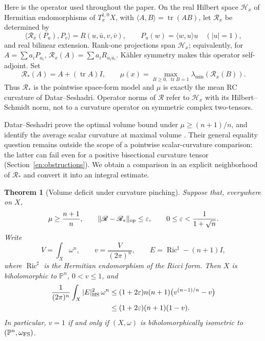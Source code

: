 \documentclass[12pt]{amsart}
\newtheorem{thm}{Theorem}[section]
\theoremstyle{definition}
\theoremstyle{remark}
\numberwithin{equation}{section}
\DeclareMathOperator{\Ric}{Ric}
\DeclareMathOperator{\tr}{tr}
\theoremstyle{plain}
\theoremstyle{remark}
\theoremstyle{definition}
\begin{document}
Here is the operator used throughout the paper. On the real Hilbert space
$\mathcal H_x$ of Hermitian endomorphisms of $T_x^{1,0}X$, with
$\langle A,B\rangle=\tr(AB)$, let $\mathscr R_x$ be determined by
\begin{equation}\label{en:Rdef}
 \langle\mathscr R_x(P_u),P_v\rangle=R(u,\bar u,v,\bar v),
 \qquad P_u(w)=\langle w,u\rangle u\quad (|u|=1),
\end{equation}
and real bilinear extension. Rank-one projections span $\mathcal H_x$;
equivalently, for $A=\sum a_iP_{u_i}$,
$\mathscr R_x(A)=\sum a_iR_{u_i\bar u_i}$.
K\"ahler symmetry makes this operator self-adjoint. Set
\begin{equation}\label{en:model}
 \mathscr R_*(A)=A+(\tr A)I,
 \qquad \mu(x)=\max_{B\geq0,\ \tr B=1}\lambda_{\min}(\mathscr R_x(B)).
\end{equation}
Thus $\mathscr R_*$ is the pointwise space-form model and $\mu$ is exactly
the mean RC curvature of Datar--Seshadri. Operator norms of $\mathscr R$
refer to $\mathcal H_x$ with its Hilbert--Schmidt norm, not to a curvature
operator on symmetric complex two-tensors.

Datar--Seshadri prove the optimal volume bound under
$\mu\geq(n+1)/n$, and identify the average scalar curvature at maximal
volume \cite[Theorems 1.1 and 5.2]{en:DS}. Their general equality question
remains outside the scope of a pointwise scalar-curvature comparison:
the latter can fail even for a positive bisectional curvature tensor
(Section~\ref{en:obstructions}). We obtain a comparison in an explicit
neighborhood of $\mathscr R_*$ and convert it into an integral estimate.

\begin{thm}[Volume deficit under curvature pinching]\label{en:main}
Suppose that, everywhere on $X$,
\begin{equation}\label{en:assumptions}
 \mu\geq\frac{n+1}{n},\qquad
 \|\mathscr R-\mathscr R_*\|_{\rm op}\leq\varepsilon,
 \qquad 0\leq\varepsilon<\frac1{1+\sqrt n}.
\end{equation}
Write
\[
 V=\int_X\omega^n,\qquad v=\frac{V}{(2\pi)^n},
 \qquad E=\Ric^\sharp-(n+1)I,
\]
where $\Ric^\sharp$ is the Hermitian endomorphism of the Ricci form.
Then $X$ is biholomorphic to $\mathbb P^n$, $0<v\leq1$, and
\begin{align}
 \frac1{(2\pi)^n}\int_X |E|_{\rm HS}^2\,\omega^n
 &\leq (1+2\varepsilon)n(n+1)
       \bigl(v^{(n-1)/n}-v\bigr)\label{en:sharpform}\\
 &\leq (1+2\varepsilon)(n+1)(1-v).\label{en:deficit}
\end{align}
In particular, $v=1$ if and only if $(X,\omega)$ is biholomorphically
isometric to $(\mathbb P^n,\omega_{\rm FS})$.
\end{thm}
\end{document}
